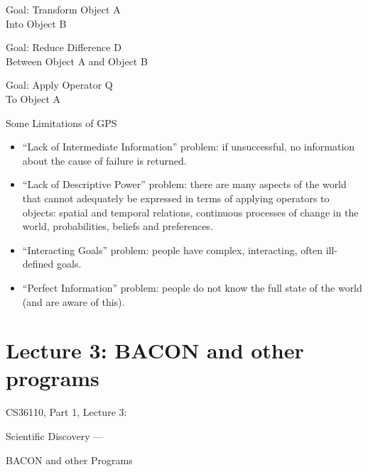 \documentclass{article}
\begin{document}
\begin{slide}{}
{\Large Goal: Transform Object A}\\{\Large Into Object B}

\begin{center}


\end{center}
\end{slide}

\begin{slide}{}
{\Large Goal: Reduce Difference D}\\{\Large Between Object A and Object B}

\begin{center}


\end{center}
\end{slide}

\begin{slide}
{\Large Goal: Apply Operator Q}\\{\Large To Object A}

\begin{center}


\end{center}
\end{slide}

\begin{slide}{}
{\Large Some Limitations of GPS}
\begin{itemize}
\item ``Lack of Intermediate Information'' problem: if unsuccessful,
no information about the cause of failure is returned.
\item ``Lack of Descriptive Power'' problem: there are many aspects of
the world that cannot adequately be expressed in terms of applying
operators to objects: spatial and temporal relations, continuous
processes of change in the world, probabilities, beliefs and
preferences.
\item ``Interacting Goals'' problem: people have complex, interacting,
often ill-defined goals.
\item ``Perfect Information'' problem: people do not know the full
state of the world (and are aware of this). 
\end{itemize}
\end{slide}

\section{Lecture 3: BACON and other programs}
\begin{slide}{}
{\Large CS36110, Part 1, Lecture 3:}

{\Large Scientific Discovery ---}

{\Large BACON and other Programs}
\end{slide}
\end{document}
